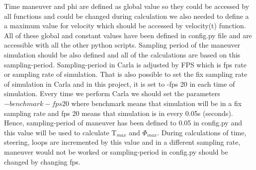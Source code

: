 Time maneuver and phi are defined as global value so they could be accessed by all functions and could be changed during calculation we also needed to define a a maximum value for velocity which should be accessed by velocity(t) function. All of these global and constant values have been defined in config.py file and are accessible with all the other python scripts.
Sampling period of the maneuver simulation should be also defined and all of the calculations are based on this sampling-period. Sampling-period in Carla is adjusted by FPS which is fps rate or sampling rate of simulation. That is also possible to set the fix sampling rate of simulation in Carla and in this project, it is set to -fps 20 in each time of simulation. Every time we perform Carla we should set the parameters $-benchmark -fps 20$ where benchmark means that simulation will be in a fix sampling rate and fps 20 means that simulation is in every 0.05s (seconds). Hence, sampling-period of maneuver has been defined to 0.05 in config.py and this value will be used to calculate T$_{max}$ and $\Phi_{max}$. During calculations of time, steering, loops are incremented by this value and in a different sampling rate, maneuver would not be worked or sampling-period in config.py should be changed by changing fps.